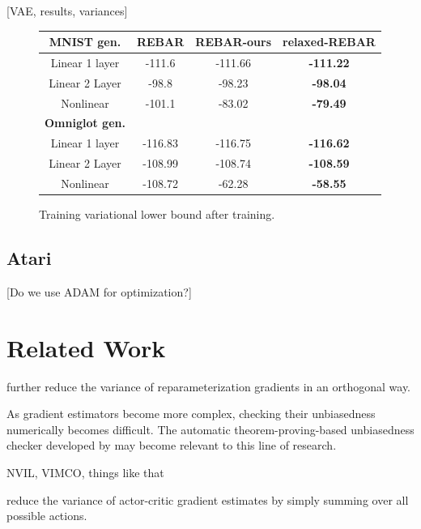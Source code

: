 \documentclass{article}
\begin{document}
[VAE, results, variances]
\begin{figure}
\begin{center}
 \begin{tabular}{|c|c c c||} 
 \hline
 \textbf{MNIST gen.} & REBAR \citep{tucker2017rebar} & REBAR-ours & relaxed-REBAR \\ [0.5ex] 
 \hline
 Linear 1 layer   & -111.6 & -111.66 & \textbf{-111.22} \\ 
 Linear 2 Layer & -98.8  & -98.23 & \textbf{-98.04} \\
 Nonlinear         & -101.1  &  -83.02 &  \textbf{-79.49} \\
 \hline\hline
 \textbf{Omniglot gen.} &&&\\
 \hline
 Linear 1 layer   & -116.83  & -116.75 & \textbf{-116.62} \\ 
 Linear 2 Layer & -108.99  & -108.74 & \textbf{-108.59} \\
 Nonlinear         & -108.72  & -62.28 & \textbf{-58.55} \\
 \hline
\end{tabular}
\end{center}
\label{tab:vae}
\caption{Training variational lower bound after training.}
\end{figure}


\subsection{Atari}

\citet{mnih-dqn-2015}

[Do we use ADAM \citep{kingma2015adam} for optimization?]





\section{Related Work}
\label{related work}

\citet{miller2017reducing} further reduce the variance of reparameterization gradients in an orthogonal way.

As gradient estimators become more complex, checking their unbiasedness numerically becomes difficult.
The automatic theorem-proving-based unbiasedness checker developed by \citet{selsam2017developing} may become relevant to this line of research.

NVIL, VIMCO, things like that

\citet{asadi2017mean} reduce the variance of actor-critic gradient estimates by simply summing over all possible actions.
\end{document}
